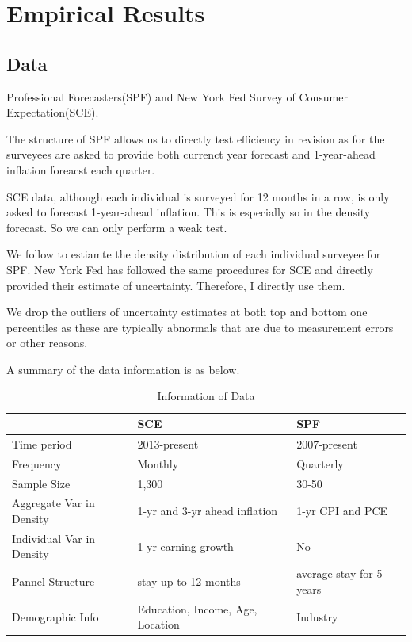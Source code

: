 \documentclass[]{article}
\begin{document}
\section{Empirical Results}\label{empirical}

\subsection{Data}


Professional Forecasters(SPF) and New York Fed Survey of Consumer Expectation(SCE). 

The structure of SPF allows us to directly test efficiency in revision as for the surveyees are asked to provide both currenct year forecast and 1-year-ahead inflation foreacst each quarter. 

SCE data, although each individual is surveyed for 12 months in a row, is only asked to forecast 1-year-ahead inflation. This is especially so in the density forecast. So we can only perform a weak test. 

We follow \citet{engelberg2009comparing} to estiamte the density distribution of each individual surveyee for SPF. New York Fed has followed the same procedures for SCE and directly provided their estimate of uncertainty. Therefore, I directly use them. 

We drop the outliers of uncertainty estimates at both top and bottom one percentiles as these are typically abnormals that are due to measurement errors or other reasons.   


A summary of the data information is as below. 

\begin{table}[ht]
			\caption{Information of Data}
			\label{DataInfo}
	\begin{tabular}{lll} 

		\hline 
		& SCE & SPF        \\
		\hline 
		Time period                                    & 2013-present                            & 2007-present             \\
		Frequency                                      & Monthly                                 & Quarterly                \\
		Sample Size                                    & 1,300                                   & 30-50                    \\
		Aggregate Var in Density                       & 1-yr  and 3-yr ahead inflation          & 1-yr CPI and PCE         \\
		Individual Var in Density                      & 1-yr earning growth                     & No                       \\
		Pannel Structure                               & stay up to 12 months                    & average stay for 5 years \\
		Demographic Info                        & Education, Income, Age, Location        & Industry    \\
		\hline 
	\end{tabular}
\end{table}
\end{document}
